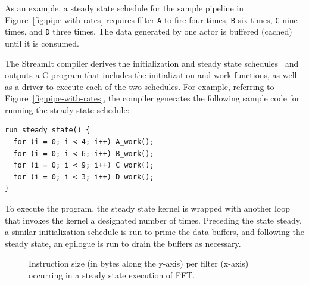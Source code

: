 As an example, a steady state schedule for the sample pipeline in
Figure~\ref{fig:pipe-with-rates} requires filter \texttt{A} to fire
four times, \texttt{B} six times, \texttt{C} nine times, and
\texttt{D} three times. 
The data generated by one actor is buffered (cached) until it is
consumed.

The StreamIt compiler derives the initialization and steady state
schedules~\cite{karczma-lctes03} and outputs a C program that includes
the initialization and work functions, as well as a driver to execute
each of the two schedules. For example, referring to
Figure~\ref{fig:pipe-with-rates}, the compiler generates the following
sample code for running the steady state schedule:
\begin{verbatim}
run_steady_state() {
  for (i = 0; i < 4; i++) A_work();
  for (i = 0; i < 6; i++) B_work();
  for (i = 0; i < 9; i++) C_work();
  for (i = 0; i < 3; i++) D_work();
}
\end{verbatim}
To execute the program, the steady state kernel is wrapped with
another loop that invokes the kernel a designated number of
times. Preceding the state steady, a similar initialization schedule
is run to prime the data buffers, and following the steady state, an
epilogue is run to drain the buffers as necessary.

\begin{figure}[t]
\begin{center}
\vspace{-12pt}
 \vspace{-6pt}
 \caption{Instruction size (in bytes along the y-axis) per filter
 (x-axis) occurring in a steady state execution of FFT.}
 \label{fig:ssi-single}
\vspace{-18pt}
\end{center}
\end{figure}

